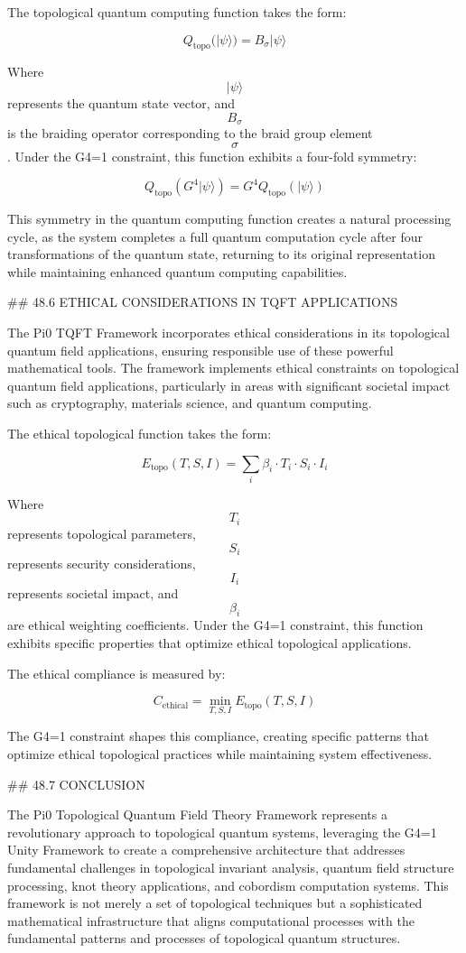 The topological quantum computing function takes the form:

$$ Q_{\text{topo}}(|\psi\rangle) = B_{\sigma} |\psi\rangle $$

Where $$ |\psi\rangle $$ represents the quantum state vector, and $$ B_{\sigma} $$ is the braiding operator corresponding to the braid group element $$ \sigma $$. Under the G4=1 constraint, this function exhibits a four-fold symmetry:

$$ Q_{\text{topo}}(G^4 |\psi\rangle) = G^4 Q_{\text{topo}}(|\psi\rangle) $$

This symmetry in the quantum computing function creates a natural processing cycle, as the system completes a full quantum computation cycle after four transformations of the quantum state, returning to its original representation while maintaining enhanced quantum computing capabilities.

## 48.6 ETHICAL CONSIDERATIONS IN TQFT APPLICATIONS

The Pi0 TQFT Framework incorporates ethical considerations in its topological quantum field applications, ensuring responsible use of these powerful mathematical tools. The framework implements ethical constraints on topological quantum field applications, particularly in areas with significant societal impact such as cryptography, materials science, and quantum computing.

The ethical topological function takes the form:

$$ E_{\text{topo}}(T, S, I) = \sum_{i} \beta_i \cdot T_i \cdot S_i \cdot I_i $$

Where $$ T_i $$ represents topological parameters, $$ S_i $$ represents security considerations, $$ I_i $$ represents societal impact, and $$ \beta_i $$ are ethical weighting coefficients. Under the G4=1 constraint, this function exhibits specific properties that optimize ethical topological applications.

The ethical compliance is measured by:

$$ C_{\text{ethical}} = \min_{T, S, I} E_{\text{topo}}(T, S, I) $$

The G4=1 constraint shapes this compliance, creating specific patterns that optimize ethical topological practices while maintaining system effectiveness.

## 48.7 CONCLUSION

The Pi0 Topological Quantum Field Theory Framework represents a revolutionary approach to topological quantum systems, leveraging the G4=1 Unity Framework to create a comprehensive architecture that addresses fundamental challenges in topological invariant analysis, quantum field structure processing, knot theory applications, and cobordism computation systems. This framework is not merely a set of topological techniques but a sophisticated mathematical infrastructure that aligns computational processes with the fundamental patterns and processes of topological quantum structures.


